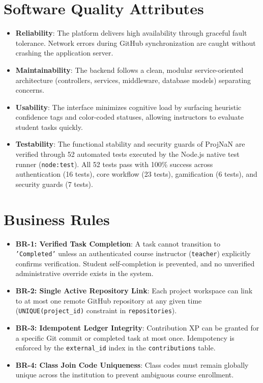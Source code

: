 \documentclass{scrreprt}
\begin{document}
\section{Software Quality Attributes}\label{sec:quality_attributes}
\begin{itemize}
    \item \textbf{Reliability}: The platform delivers high availability through graceful fault tolerance. Network errors during GitHub synchronization are caught without crashing the application server.
    \item \textbf{Maintainability}: The backend follows a clean, modular service-oriented architecture (controllers, services, middleware, database models) separating concerns.
    \item \textbf{Usability}: The interface minimizes cognitive load by surfacing heuristic confidence tags and color-coded statuses, allowing instructors to evaluate student tasks quickly.
    \item \textbf{Testability}: The functional stability and security guards of ProjNaN are verified through 52 automated tests executed by the Node.js native test runner (\texttt{node:test}). All 52 tests pass with 100\% success across authentication (16 tests), core workflow (23 tests), gamification (6 tests), and security guards (7 tests).
\end{itemize}

\section{Business Rules}\label{sec:business_rules}
\begin{itemize}
    \item \textbf{BR-1: Verified Task Completion}: A task cannot transition to \texttt{'Completed'} unless an authenticated course instructor (\texttt{teacher}) explicitly confirms verification. Student self-completion is prevented, and no unverified administrative override exists in the system.
    \item \textbf{BR-2: Single Active Repository Link}: Each project workspace can link to at most one remote GitHub repository at any given time (\texttt{UNIQUE(project\_id)} constraint in \texttt{repositories}).
    \item \textbf{BR-3: Idempotent Ledger Integrity}: Contribution XP can be granted for a specific Git commit or completed task at most once. Idempotency is enforced by the \texttt{external\_id} index in the \texttt{contributions} table.
    \item \textbf{BR-4: Class Join Code Uniqueness}: Class codes must remain globally unique across the institution to prevent ambiguous course enrollment.
\end{itemize}
\end{document}
